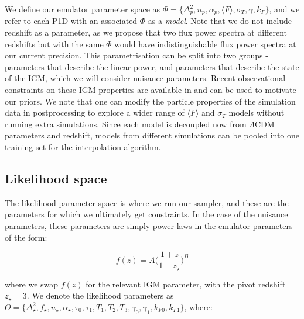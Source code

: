 \documentclass[]{article}
\begin{document}
\noindent We define our emulator parameter space as $\Phi=\{ \Delta^2_p,n_p,\alpha_p,\langle F\rangle,\sigma_T,\gamma,k_F \}$, and we refer to each P1D with an associated 
$\Phi$ as a \textit{model}. Note that we do not include redshift as a parameter, as we 
propose that two flux power spectra at different redshifts but with the same $\Phi$ would 
have indistinguishable flux power spectra at our current precision. This parametrisation 
can be split into two groups - parameters that describe the linear power, and parameters 
that describe the state of the IGM, which we will consider nuisance parameters. Recent 
observational constraints on these IGM properties are available in \cite{Walther2018} and 
can be used to motivate our priors. We note that one can modify the particle properties 
of the simulation data in postprocessing to explore a wider range of $\langle F\rangle$ 
and $\sigma_T$ models without running extra simulations. Since each model is decoupled 
now from $\Lambda$CDM parameters and redshift, models from different simulations can be 
pooled into one training set for the interpolation algorithm.

\subsection{Likelihood space}
The likelihood parameter space is where we run our sampler, and these are the parameters 
for which we ultimately get constraints. In the case of the nuisance parameters, these
parameters are simply power laws in the emulator parameters of the form:

\begin{equation}
    f(z)=A\bigg(\frac{1+z}{1+z_\star}\bigg)^B
\end{equation}

\noindent where we swap $f(z)$ for the relevant IGM parameter, with the pivot 
redshift $z_\star=3$. We denote the likelihood parameters as $\Theta=\{ \Delta^2_\star, f_\star, n_\star, \alpha_\star, \tau_0, \tau_1, T_1, T_2, T_3, \gamma_0, \gamma_1, k_{F0}, k_{F1} \}$, where:
\end{document}
